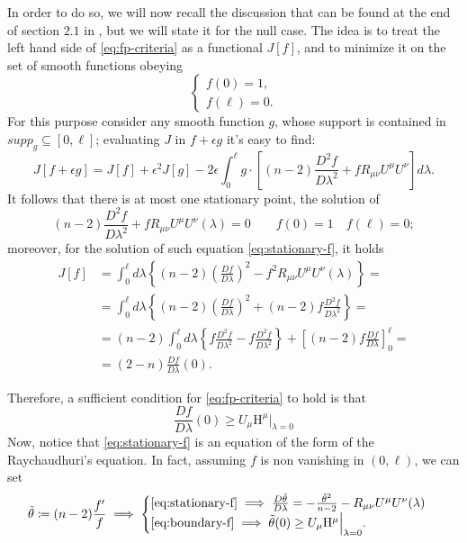 	In order to do so, we will now recall the discussion that can be found at the end of section \(2.1\) in \cite{fewster2020new}, but we will state it for the null case.
	The idea is to treat the left hand side of \ref{eq:fp-criteria} as a functional \(J[f]\), and to minimize it on the set of smooth functions obeying 
	\[
	\begin{cases}
	f(0) = 1, \\
	f(\ell) = 0.
	\end{cases}
	\]
	For this purpose consider any smooth function \(g\), whose support is contained in \(supp_g \subseteq [0, \ell]\); evaluating \(J\) in \(f + \epsilon g\) it's easy to find:
	\[
	J[f + \epsilon g] = J[f] + \epsilon^2J[g] - 2\epsilon\int_{0}^{\ell} g \cdot \left[(n - 2) \frac{D^2f}{D\lambda^2} + fR_{\mu\nu}U^{\mu}U^{\nu}\right] d\lambda.
	\]
	It follows that there is at most one stationary point, the solution of
	\begin{equation}
	\label{eq:stationary-f}
		(n - 2) \frac{D^2f}{D\lambda^2} + fR_{\mu\nu}U^{\mu}U^{\nu}(\lambda) = 0 \quad \quad f(0) = 1 \quad f(\ell) = 0;
	\end{equation}
	moreover, for the solution of such equation \eqref{eq:stationary-f}, it holds
	\begin{align*}
	J[f] &= \int_{0}^{\ell} d\lambda \left\lbrace (n - 2) \left(\frac{Df}{D\lambda}\right)^2 -f^2R_{\mu\nu}U^{\mu}U^{\nu}(\lambda) \right\rbrace= \\
%	
	&= \int_{0}^{\ell} d\lambda \left\lbrace (n - 2) \left(\frac{Df}{D\lambda}\right)^2 +(n - 2)f\frac{D^2f}{D\lambda^2}  \right\rbrace =\\
%	
	&= (n - 2) \int_{0}^{\ell} d\lambda \left\lbrace f\frac{D^2f}{D\lambda^2} - f\frac{D^2f}{D\lambda^2} \right\rbrace + \left[(n - 2) f\frac{Df}{D\lambda} \right]_0^{\ell} =\\
%	
	&= (2 - n)\frac{Df}{D\lambda}(0).	
	\end{align*}
	
	Therefore, a sufficient condition for \eqref{eq:fp-criteria} to hold is that
	\begin{equation}
		\label{eq:boundary-f}
		\frac{Df}{D\lambda}(0) \ge U_{\mu}\mathrm{H}^{\mu}\Big\vert_{\lambda = 0}
	\end{equation}
	Now, notice that \eqref{eq:stationary-f} is an equation of the form of the Raychaudhuri's equation. In fact, assuming \(f\) is non vanishing in \((0, \ell)\), we can set 
	\[
	\tilde{\theta}\coloneqq (n - 2) \frac{f'}{f} \implies
	\begin{cases}
	\eqref{eq:stationary-f} \implies \frac{D\tilde{\theta}}{D\lambda} = -\frac{\tilde{\theta}^2}{n - 2} - R_{\mu\nu}U^{\mu}U^{\nu}(\lambda) \\
	\eqref{eq:boundary-f} \implies \tilde{\theta}(0) \ge U_{\mu}\mathrm{H}^{\mu}\Big\vert_{\lambda = 0}.
	\end{cases}	
	\]
	

